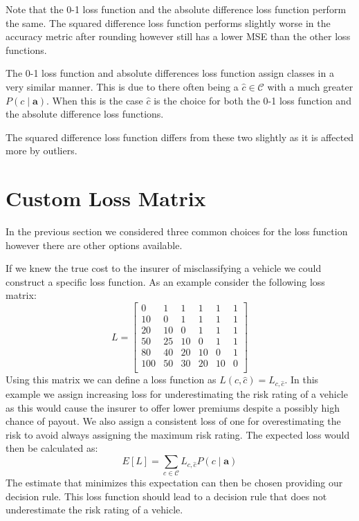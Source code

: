 Note that the 0-1 loss function and the absolute difference loss function perform the same.
The squared difference loss function performs slightly worse in the accuracy metric after rounding however still has a lower MSE than the other loss functions.

The 0-1 loss function and absolute differences loss function assign classes in a very similar manner.
This is due to there often being a $\hat{c} \in \mathcal{C}$ with a much greater $P(c \mid \mathbf{a})$.
When this is the case $\hat{c}$ is the choice for both the 0-1 loss function and the absolute difference loss functions.

The squared difference loss function differs from these two slightly as it is affected more by outliers.

\section{Custom Loss Matrix}
In the previous section we considered three common choices for the loss function however there are other options available.

If we knew the true cost to the insurer of misclassifying a vehicle we could construct a specific loss function.
As an example consider the following loss matrix:
\begin{equation}
	L = 
		\begin{bmatrix}
			0   & 1  & 1  & 1  & 1  & 1 \\
			10  & 0  & 1  & 1  & 1  & 1 \\
			20  & 10 & 0  & 1  & 1  & 1 \\
			50  & 25 & 10 & 0  & 1  & 1 \\
			80  & 40 & 20 & 10 & 0  & 1 \\
			100 & 50 & 30 & 20 & 10 & 0 \\
		\end{bmatrix}
\end{equation}
Using this matrix we can define a loss function as $L(c, \hat{c}) = L_{c,\hat{c}}$.
In this example we assign increasing loss for underestimating the risk rating of a vehicle as this would cause the insurer to offer lower premiums despite a possibly high chance of payout.
We also assign a consistent loss of one for overestimating the risk to avoid always assigning the maximum risk rating.
The expected loss would then be calculated as:
\begin{equation}
	E[L] = \sum_{c \in \mathcal{C}} L_{c,\hat{c}}P(c \mid \mathbf{a})
\end{equation}
The estimate that minimizes this expectation can then be chosen providing our decision rule.
This loss function should lead to a decision rule that does not underestimate the risk rating of a vehicle.

